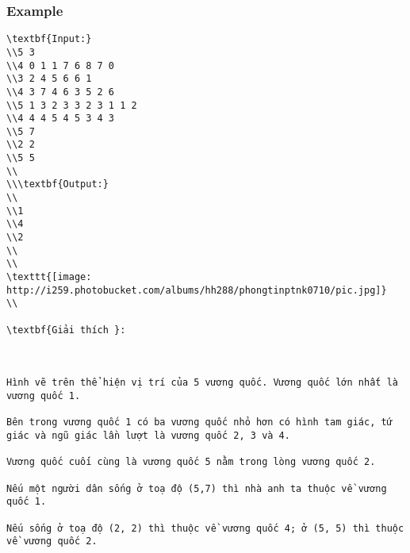 \subsubsection{   Example  }
\begin{verbatim}
\textbf{Input:}
\\5 3
\\4 0 1 1 7 6 8 7 0
\\3 2 4 5 6 6 1
\\4 3 7 4 6 3 5 2 6
\\5 1 3 2 3 3 2 3 1 1 2
\\4 4 4 5 4 5 3 4 3
\\5 7
\\2 2
\\5 5
\\
\\\textbf{Output:}
\\
\\1
\\4
\\2
\\
\\
\texttt{[image: http://i259.photobucket.com/albums/hh288/phongtinptnk0710/pic.jpg]}
\\

\textbf{Giải thích }: 

 

Hình vẽ trên thể hiện vị trí của 5 vương quốc. Vương quốc lớn nhất là vương quốc 1. 

Bên trong vương quốc 1 có ba vương quốc nhỏ hơn có hình tam giác, tứ giác và ngũ giác lần lượt là vương quốc 2, 3 và 4.

Vương quốc cuối cùng là vương quốc 5 nằm trong lòng vương quốc 2. 

Nếu một người dân sống ở toạ độ (5,7) thì nhà anh ta thuộc về vương quốc 1. 

Nếu sống ở toạ độ (2, 2) thì thuộc về vương quốc 4; ở (5, 5) thì thuộc về vương quốc 2.\end{verbatim}